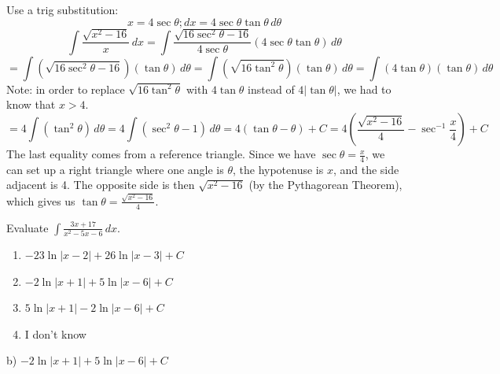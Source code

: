 \documentclass[addpoints,12pt,answers]{exam}
\begin{document}
\begin{questions}
\begin{solution}
    Use a trig substitution:    
    $$x=4\sec\theta; dx=4\sec\theta\tan\theta\,d\theta$$
    $$\int\frac{\sqrt{x^2-16}}{x}\,dx=\int\frac{\sqrt{16\sec^2\theta-16}}{4\sec\theta}(4\sec\theta\tan\theta)\,d\theta$$
    $$=\int\left(\sqrt{16\sec^2\theta-16}\right)(\tan\theta)\,d\theta=\int\left(\sqrt{16\tan^2\theta}\right)(\tan\theta)\,d\theta=\int(4\tan\theta)(\tan\theta)\,d\theta$$
    Note: in order to replace $\sqrt{16\tan^2\theta}$ with $4\tan\theta$ instead of $4|\tan\theta|$, we had to know that $x>4$.
    $$=4\int(\tan^2\theta)\,d\theta=4\int(\sec^2\theta-1)\,d\theta=4(\tan\theta-\theta)+C=4\left(\frac{\sqrt{x^2-16}}{4}-\sec^{-1}\frac{x}{4}\right)+C$$
    The last equality comes from a reference triangle. Since we have $\displaystyle\sec\theta=\frac{x}{4}$, we can set up a right triangle where one angle is $\theta$, the hypotenuse is $x$, and the side adjacent is 4. The opposite side is then $\sqrt{x^2-16}$ (by the Pythagorean Theorem), which gives us $\displaystyle\tan\theta=\frac{\sqrt{x^2-16}}{4}$.
    \begin{center}
    \end{center}
  \end{solution}
  \newpage
  \question
  Evaluate $\displaystyle\int\frac{3x+17}{x^2-5x-6}\,dx$.
  \begin{enumerate}[label=\alph*)]
    \item
    $-23\ln|x-2|+26\ln|x-3|+C$
    \item
    $-2\ln|x+1|+5\ln|x-6|+C$
    \item
    $5\ln|x+1|-2\ln|x-6|+C$
    \item
    I don't know
  \end{enumerate}
  \begin{solution}
    b) $-2\ln|x+1|+5\ln|x-6|+C$
    

\end{solution}
\end{questions}
\end{document}
